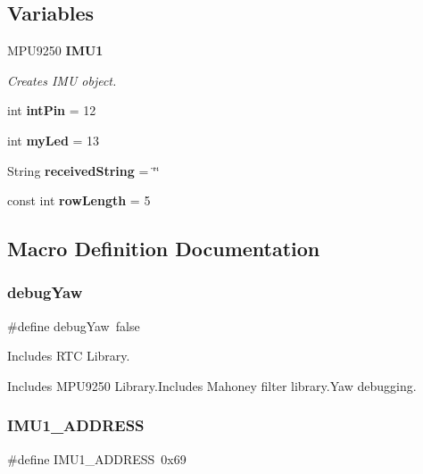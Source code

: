 \subsection*{Variables}
\begin{DoxyCompactItemize}
\item 
M\+P\+U9250 \textbf{ I\+M\+U1}
\begin{DoxyCompactList}\small\item\em Creates I\+MU object. \end{DoxyCompactList}\item 
int \textbf{ int\+Pin} = 12
\item 
int \textbf{ my\+Led} = 13
\item 
String \textbf{ received\+String} = \char`\"{}\char`\"{}
\item 
const int \textbf{ row\+Length} = 5
\end{DoxyCompactItemize}


\subsection{Macro Definition Documentation}
\mbox{\label{_sat_trackr__combined__sketch_8c_abf961632dfb5d5401c7628eca4c1224a}} 
\subsubsection{debug\+Yaw}
{\footnotesize\ttfamily \#define debug\+Yaw~false}



Includes R\+TC Library. 

Includes M\+P\+U9250 Library.\+Includes Mahoney filter library.\+Yaw debugging. \mbox{\label{_sat_trackr__combined__sketch_8c_a876dd1c5b74457dcd636dc38cadc5e4b}} 
\subsubsection{I\+M\+U1\+\_\+\+A\+D\+D\+R\+E\+SS}
{\footnotesize\ttfamily \#define I\+M\+U1\+\_\+\+A\+D\+D\+R\+E\+SS~0x69}



